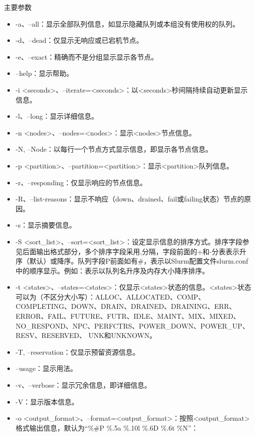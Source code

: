 \begin{frame}{主要参数}
\begin{itemize}
	\item -a、--all：显示全部队列信息，如显示隐藏队列或本组没有使用权的队列。
	\item -d、--dead：仅显示无响应或已宕机节点。
	\item -e、--exact：精确而不是分组显示显示各节点。
	\item --help：显示帮助。
	\item -i <seconds>、--iterate=<seconds>：以<seconds>秒间隔持续自动更新显示信息。
	\item -l、--long：显示详细信息。
	\item -n <nodes>、--nodes=<nodes>：显示<nodes>节点信息。
	\item -N, --Node：以每行一个节点方式显示信息，即显示各节点信息。
	\item -p <partition>、--partition=<partition>：显示<partition>队列信息。
	\item -r、--responding：仅显示响应的节点信息。
	\item -R、--list-reasons：显示不响应（down、drained、fail或failing状态）节点的原因。
	\item -s：显示摘要信息。
	\item -S <sort\_list>、--sort=<sort\_list>：设定显示信息的排序方式。排序字段参见后面输出格式部分，多个排序字段采用,分隔，字段前面的+和-分表表示升序（默认）或降序。队列字段P前面如有\#，表示以Slurm配置文件slurm.conf中的顺序显示。例如：表示以队列名升序及内存大小降序排序。
	\item -t <states>、--states=<states>：仅显示<states>状态的信息。<states>状态可以为（不区分大小写）：ALLOC、ALLOCATED、COMP、COMPLETING、DOWN、DRAIN、DRAINED、DRAINING、ERR、ERROR、FAIL、FUTURE、FUTR、IDLE、MAINT、MIX、MIXED、NO\_RESPOND、NPC、PERFCTRS、POWER\_DOWN、POWER\_UP、RESV、RESERVED、 UNK和UNKNOWN。
	\item -T, --reservation：仅显示预留资源信息。
	\item --usage：显示用法。
	\item -v、--verbose：显示冗余信息，即详细信息。
	\item -V：显示版本信息。
	\item -o <output\_format>、--format=<output\_format>：按照<output\_format>格式输出信息，默认为``\%\#P \%.5a \%.10l \%.6D \%.6t \%N''：

\end{itemize}
\end{frame}
